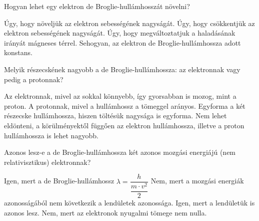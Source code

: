 \documentclass[addpoints,11pt,a4paper]{exam}
\begin{document}
\begin{questions}
		\question Hogyan lehet egy elektron de Broglie-hullámhosszát növelni?
		\begin{choices}
			\choice  Úgy, hogy növeljük az elektron sebességének nagyságát.
			\choice Úgy, hogy csökkentjük az elektron sebességének nagyságát.
			\choice Úgy, hogy megváltoztatjuk a haladásának irányát mágneses térrel.
			\choice Sehogyan, az elektron de Broglie-hullámhossza adott konstans.
		\end{choices}
		
		\question Melyik részecskének nagyobb a de Broglie-hullámhossza: az elektronnak vagy
		pedig a protonnak?
		\begin{choices}
			\choice Az elektronnak, mivel az sokkal könnyebb, így gyorsabban is mozog, mint a
			proton.
			\choice A protonnak, mivel a hullámhossz a tömeggel arányos.
			\choice Egyforma a két részecske hullámhossza, hiszen töltésük nagysága is egyforma.
			\choice Nem lehet eldönteni, a körülményektől függően az elektron hullámhossza, illetve a
			proton hullámhossza is lehet nagyobb.
		\end{choices}
	
		\question Azonos lesz-e a de Broglie-hullámhossza két azonos mozgási energiájú (nem
		relativisztikus) elektronnak?
		\begin{choices}
			\choice Igen, mert a de Broglie-hullámhossz $\lambda = \dfrac{h}{\dfrac{m\cdot v^{2}}{2}}$
			\choice Nem, mert a mozgási energiák azonosságából nem következik a lendületek
			azonossága. 
			\choice Igen, mert a lendületük is azonos lesz. 
			\choice Nem, mert az elektronok nyugalmi tömege nem nulla.
		\end{choices}
		  
	\end{questions}
\end{document}
